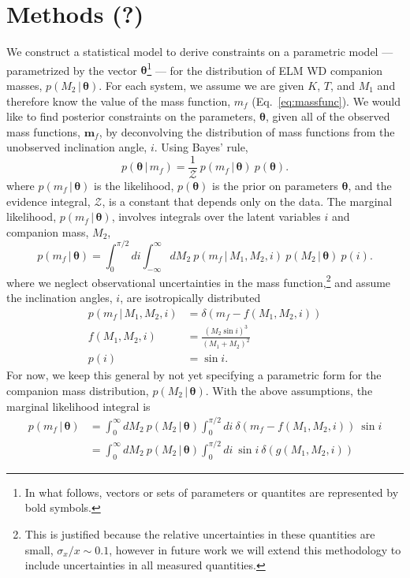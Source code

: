 \documentclass[letterpaper,12pt,preprint]{aastex}
\newcommand{\given}{\,|\,}
\newcommand{\bs}[1]{\boldsymbol{#1}}
\begin{document}
\section{Methods (?)}

We construct a statistical model to derive constraints on a parametric model --- parametrized by the vector $\bs{\theta}$\footnote{In what follows, vectors or sets of parameters or quantites are represented by bold symbols.} --- for the distribution of ELM WD companion masses, $p(M_2 \given \bs{\theta})$. For each system, we assume we are given $K$, $T$, and $M_1$ and therefore know the value of the mass function, $m_f$ (Eq.~\ref{eq:massfunc}). We would like to find posterior constraints on the parameters, $\boldsymbol{\theta}$, given all of the observed mass functions, $\bs{m}_f$, by deconvolving the distribution of mass functions from the unobserved inclination angle, $i$. Using Bayes' rule,
\begin{equation}
    p(\bs{\theta} \given m_f) = \frac{1}{\mathcal{Z}}~p(m_f \given \bs{\theta})~p(\bs{\theta}).
\end{equation}
where $p(m_f \given \bs{\theta})$ is the likelihood, $p(\bs{\theta})$ is the prior on parameters $\bs{\theta}$, and the evidence integral, $\mathcal{Z}$, is a constant that depends only on the data. The marginal likelihood, $p(m_f \given \bs{\theta})$, involves integrals over the latent variables $i$ and companion mass, $M_2$,
\begin{equation}
    p(m_f \given \bs{\theta}) = \int_0^{\pi/2} di \int_{-\infty}^\infty dM_2~p(m_f \given M_1, M_2, i)~p(M_2 \given \bs{\theta})~p(i).
\end{equation}
where we neglect observational uncertainties in the mass function,\footnote{This is justified because the relative uncertainties in these quantities are small, $\sigma_x / x \sim 0.1$, however in future work we will extend this methodology to include uncertainties in all measured quantities.} and assume the inclination angles, $i$, are isotropically distributed
\begin{align}
	p(m_f \given M_1, M_2, i) &= \delta(m_f - f(M_1, M_2, i))\\
	f(M_1, M_2, i) &= \frac{(M_2 \sin i)^3}{(M_1 + M_2)^2}\\
	p(i) &= \sin i.
\end{align}
For now, we keep this general by not yet specifying a parametric form for the companion mass distribution, $p(M_2 \given \bs{\theta})$. With the above assumptions, the marginal likelihood integral is
\begin{align}
    p(m_f \given \bs{\theta}) &= \int_{0}^\infty dM_2~p(M_2 \given \bs{\theta}) \int_0^{\pi/2} di ~ \delta(m_f - f(M_1, M_2, i))~\sin i\\
    &= \int_{0}^\infty dM_2~p(M_2 \given \bs{\theta}) \int_0^{\pi/2} di ~\sin i ~ \delta(g(M_1,M_2,i))\label{eq:delta}
\end{align}
\end{document}
